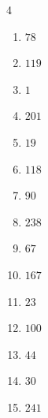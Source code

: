 \begin{multicols}{4}
\begin{enumerate}

  \item $78$


  \item $119$


  \item $1$


  \item $201$


  \item $19$


  \item $118$


  \item $90$


  \item $238$


  \item $67$


  \item $167$


  \item $23$


  \item $100$


  \item $44$


\columnbreak %

\resetques

  \item $30$


  \item $241$


\end{enumerate}
\end{multicols}
